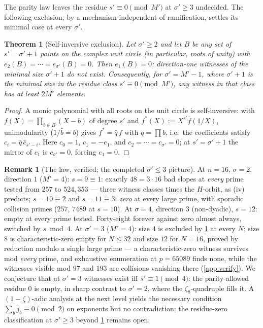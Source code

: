 \documentclass[11pt]{article}
\newtheorem{theorem}{Theorem}[section]
\theoremstyle{definition}
\newtheorem{remark}[remark]{Remark}
\begin{document}
The parity law leaves the residue $s'\equiv0\pmod{M'}$ at $\sigma'\ge3$ undecided.  The following exclusion, by a mechanism independent of ramification, settles its minimal case at every $\sigma'$.

\begin{theorem}[Self-inversive exclusion]\label{thm:selfinv}
Let $\sigma'\ge2$ and let $B$ be any set of $s'=\sigma'+1$ points on the complex unit circle (in particular, roots of unity) with $e_2(B)=\cdots=e_{\sigma'}(B)=0$.  Then $e_1(B)=0$: direction-one witnesses of the minimal size $\sigma'+1$ do not exist.  Consequently, for $\sigma'=M'-1$, where $\sigma'+1$ is the minimal size in the residue class $s'\equiv0\pmod{M'}$, any witness in that class has at least $2M'$ elements.
\end{theorem}

\begin{proof}
A monic polynomial with all roots on the unit circle is self-inversive: with $f(X)=\prod_{b\in B}(X-b)$ of degree $s'$ and $f^*(X):=X^{s'}\overline f(1/X)$, unimodularity ($1/\bar b=b$) gives $f^*=\bar q\,f$ with $q=\prod b$, i.e.\ the coefficients satisfy $c_i=\bar q\,\bar c_{s'-i}$.  Here $c_0=1$, $c_1=-e_1$, and $c_2=\cdots=c_{\sigma'}=0$; at $s'=\sigma'+1$ the mirror of $c_1$ is $c_{\sigma'}=0$, forcing $e_1=0$.
\end{proof}

\begin{remark}[The law, verified; the completed $\sigma'\le3$ picture]\label{rem:law}
At $n=16$, $\sigma=2$, direction $1$ ($M'=4$): $s=9\equiv1$: exactly $48=3\cdot16$ bad slopes at \emph{every} prime tested from $257$ to $524{,}353$ --- three witness classes times the $H$-orbit, as (iv) predicts; $s=10\equiv2$ and $s=11\equiv3$: \emph{zero} at every large prime, with sporadic collision primes ($257$, $7489$ at $s=10$).  At $\sigma=4$, direction $3$ (non-dyadic), $s=12$: empty at every prime tested.  Forty-eight forever against zero almost always, switched by $s\bmod4$.  At $\sigma'=3$ ($M'=4$): size $4$ is excluded by \cref{thm:selfinv} at every $N$; size $8$ is characteristic-zero empty for $N\le32$ and size $12$ for $N=16$, proved by reduction modulo a single large prime --- a characteristic-zero witness survives mod \emph{every} prime, and exhaustive enumeration at $p=65089$ finds none, while the witnesses visible mod $97$ and $193$ are collisions vanishing there (\cref{app:verify}).  We conjecture that at $\sigma'=3$ witnesses exist iff $s'\equiv1\pmod4$: the parity-allowed residue $0$ is empty, in sharp contrast to $\sigma'=2$, where the $\zeta_8$-quadruple fills it.  A $(1-\zeta)$-adic analysis at the next level yields the necessary condition $\sum_bj_b\equiv0\pmod2$ on exponents but no contradiction; the residue-zero classification at $\sigma'\ge3$ beyond \cref{thm:selfinv} remains open.
\end{remark}
\end{document}
